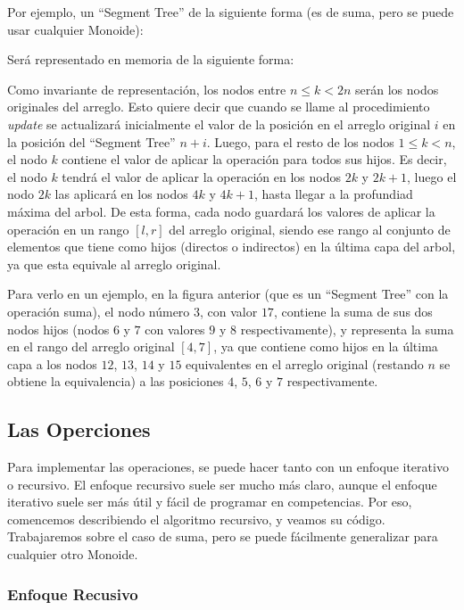 \documentclass{article}
\begin{document}
Por ejemplo, un ``Segment Tree'' de la siguiente forma (es de suma, pero se puede usar cualquier Monoide):



Será representado en memoria de la siguiente forma:



Como invariante de representación, los nodos entre $n \leq k < 2n$ serán los nodos originales del arreglo. Esto quiere decir que cuando se llame al procedimiento \textit{update} se actualizará inicialmente el valor de la posición en el arreglo original $i$ en la posición del ``Segment Tree'' $n + i$. Luego, para el resto de los nodos  $1 \leq k < n$, el nodo $k$ contiene el valor de aplicar la operación para todos sus hijos. Es decir, el nodo $k$ tendrá el valor de aplicar la operación en los nodos $2k$ y $2k+1$, luego el nodo $2k$ las aplicará en los nodos $4k$ y $4k + 1$, hasta llegar a la profundiad máxima del arbol. De esta forma, cada nodo guardará los valores de aplicar la operación en un rango $[l,r]$ del arreglo original, siendo ese rango al conjunto de elementos que tiene como hijos (directos o indirectos) en la última capa del arbol, ya que esta equivale al arreglo original.

Para verlo en un ejemplo, en la figura anterior (que es un ``Segment Tree'' con la operación suma), el nodo número $3$, con valor $17$, contiene la suma de sus dos nodos hijos (nodos $6$ y $7$ con valores $9$ y $8$ respectivamente), y representa la suma en el rango del arreglo original $[4,7]$, ya que contiene como hijos en la última capa a los nodos $12$, $13$, $14$ y $15$ equivalentes en el arreglo original (restando $n$ se obtiene la equivalencia) a las posiciones $4$, $5$, $6$ y $7$ respectivamente.

\subsection{Las Operciones}

Para implementar las operaciones, se puede hacer tanto con un enfoque iterativo o recursivo. El enfoque recursivo suele ser mucho más claro, aunque el enfoque iterativo suele ser más útil y fácil de programar en competencias. Por eso, comencemos describiendo el algoritmo recursivo, y veamos su código. Trabajaremos sobre el caso de suma, pero se puede fácilmente generalizar para cualquier otro Monoide.

\subsubsection{Enfoque Recusivo}
\end{document}
